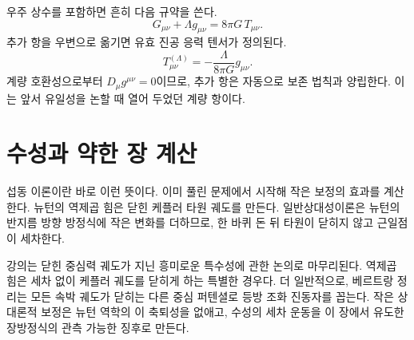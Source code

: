 우주 상수를 포함하면 흔히 다음 규약을 쓴다.
\begin{equation}
 G_{\mu\nu}+\Lambda g_{\mu\nu}
 =
 8\pi G\,T_{\mu\nu}.
\end{equation}
추가 항을 우변으로 옮기면 유효 진공 응력 텐서가 정의된다.
\begin{equation}
 T_{\mu\nu}^{(\Lambda)}
 =
 -\frac{\Lambda}{8\pi G}g_{\mu\nu}.
\end{equation}
계량 호환성으로부터 \(D_\mu g^{\mu\nu}=0\)이므로, 추가 항은 자동으로 보존 법칙과 양립한다. 이는 앞서 유일성을 논할 때 열어 두었던 계량 항이다.

\section{수성과 약한 장 계산}

\begin{classroomqa}
\end{classroomqa}

섭동 이론이란 바로 이런 뜻이다. 이미 풀린 문제에서 시작해 작은 보정의 효과를 계산한다. 뉴턴의 역제곱 힘은 닫힌 케플러 타원 궤도를 만든다. 일반상대성이론은 뉴턴의 반지름 방향 방정식에 작은 변화를 더하므로, 한 바퀴 돈 뒤 타원이 닫히지 않고 근일점이 세차한다.

강의는 닫힌 중심력 궤도가 지닌 흥미로운 특수성에 관한 논의로 마무리된다. 역제곱 힘은 세차 없이 케플러 궤도를 닫히게 하는 특별한 경우다. 더 일반적으로, 베르트랑 정리는 모든 속박 궤도가 닫히는 다른 중심 퍼텐셜로 등방 조화 진동자를 꼽는다. 작은 상대론적 보정은 뉴턴 역학의 이 축퇴성을 없애고, 수성의 세차 운동을 이 장에서 유도한 장방정식의 관측 가능한 징후로 만든다.